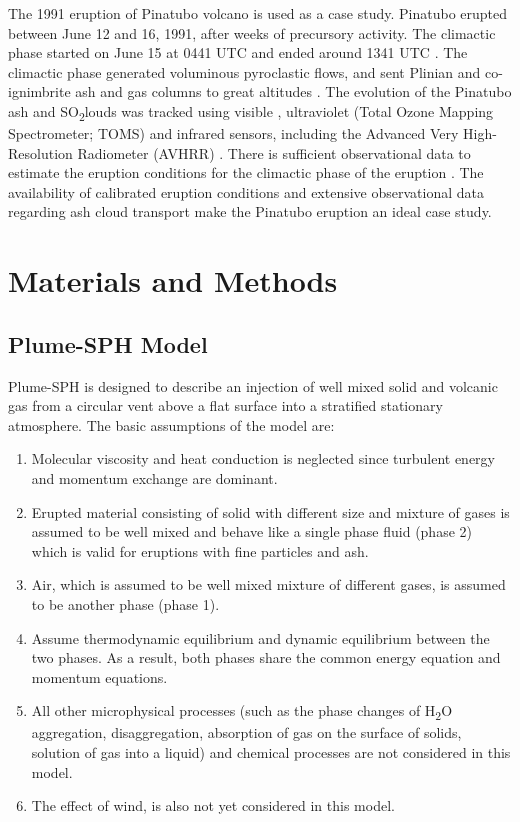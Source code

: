\documentclass[utf8]{frontiersSCNS} %
\begin{document}
The 1991 eruption of Pinatubo volcano is used as a case study. Pinatubo erupted between June 12 and 16, 1991, after weeks of precursory activity. The climactic phase started on June 15 at 0441 UTC and ended around 1341 UTC \citep{holasek1996satellite}. The climactic phase generated voluminous pyroclastic flows, and sent Plinian and co-ignimbrite ash and gas columns to great altitudes \citep{scott1996pyroclastic}. The evolution of the Pinatubo ash and \texorpdfstring{SO\textsubscript{2}} clouds was tracked using visible \citep{holasek1996satellite}, ultraviolet (Total Ozone Mapping Spectrometer; TOMS) \citep{guo2004re} and infrared sensors, including the Advanced Very High-Resolution Radiometer (AVHRR) \citep{guo2004particles}. There is sufficient observational data to estimate the eruption conditions for the climactic phase of the eruption \citep{suzuki2009three}. The availability of calibrated eruption conditions and extensive observational data regarding ash cloud transport make the Pinatubo eruption an ideal case study.

\section{Materials and Methods} \label{sec:Methodology}

\subsection {Plume-SPH Model} \label{sec:plume-sph}
Plume-SPH  \citep{cao2018plume} is designed to describe an injection of well mixed solid and volcanic gas from a circular vent above a flat surface into a stratified stationary atmosphere. The basic assumptions of the model are: 
\begin{enumerate}
\item Molecular viscosity and heat conduction is neglected since turbulent energy and momentum exchange are dominant.
\item Erupted material consisting of solid with different size and mixture of gases  is assumed to be well mixed and behave like a single phase fluid (phase 2) which is valid for eruptions with fine particles and ash.
\item Air, which is assumed to be well mixed mixture of different gases, is assumed to be another phase (phase 1).
\item Assume thermodynamic equilibrium and dynamic equilibrium between the two phases. As a result, both phases share the common energy equation and momentum equations.
\item All other microphysical processes (such as the phase changes of \texorpdfstring{H\textsubscript{2}O}, aggregation, disaggregation, absorption of gas on the surface of solids, solution of gas into a liquid) and chemical processes are not considered in this model.
\item The effect of wind, is also not yet considered in this model. 
\end{enumerate}
\end{document}
